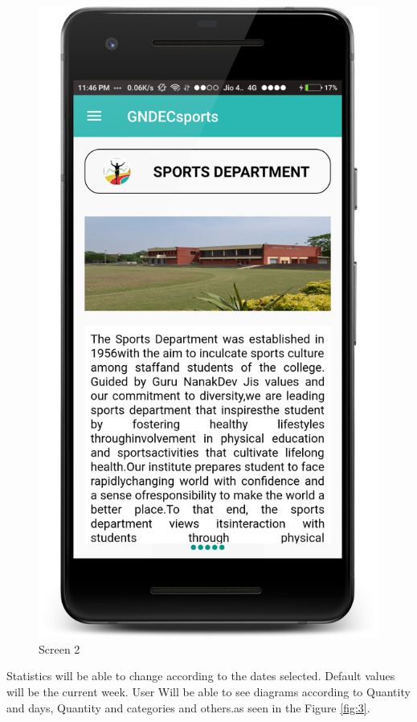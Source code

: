 \begin{figure}[ht]
	\centering
	\includegraphics[scale=0.49]{images/s2.png}
	\caption{Screen 2}
	\label{fig:2}
\end{figure}

\noindent  Statistics will be able to change according to the dates selected. Default values will be the current week. User Will be able to see diagrams according to Quantity and
days, Quantity and categories and others.as seen in the Figure \ref{fig:3}.\\

